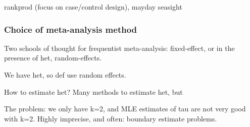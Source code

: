 rankprod (focus on case/control design), mayday seasight

\subsubsection{Choice of meta-analysis method}

Two schools of thought for frequentist meta-analysis: 
fixed-effect, 
or in the presence of het, random-effects.

We have het, so def use random effects.

How to estimate het?
Many methods to estimate het, but

The problem: we only have k=2, and MLE estimates of tau are not very good with k=2.
Highly imprecise, and often:
boundary estimate problems.  

